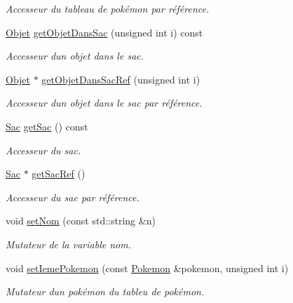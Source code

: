 \begin{DoxyCompactItemize}
\begin{DoxyCompactList}\small\item\em Accesseur du tableau de pokémon par référence. \end{DoxyCompactList}\item 
\hyperlink{class_objet}{Objet} \hyperlink{class_personnage_a32cf123b507c36c8adbf9bd22cb0b9a2}{get\+Objet\+Dans\+Sac} (unsigned int i) const
\begin{DoxyCompactList}\small\item\em Accesseur d\textquotesingle{}un objet dans le sac. \end{DoxyCompactList}\item 
\hyperlink{class_objet}{Objet} $\ast$ \hyperlink{class_personnage_a6b3462a550a38c9e9163495c2b2015f4}{get\+Objet\+Dans\+Sac\+Ref} (unsigned int i)
\begin{DoxyCompactList}\small\item\em Accesseur d\textquotesingle{}un objet dans le sac par référence. \end{DoxyCompactList}\item 
\hyperlink{class_sac}{Sac} \hyperlink{class_personnage_aa6dd3ce808644f01d0cdb891f67e896c}{get\+Sac} () const
\begin{DoxyCompactList}\small\item\em Accesseur du sac. \end{DoxyCompactList}\item 
\hyperlink{class_sac}{Sac} $\ast$ \hyperlink{class_personnage_acb7d9ff9b6b6753b8c93fae58f428db1}{get\+Sac\+Ref} ()
\begin{DoxyCompactList}\small\item\em Accesseur du sac par référence. \end{DoxyCompactList}\item 
void \hyperlink{class_personnage_a46d6d6f6f9b647c04c1cad509bec0935}{set\+Nom} (const std\+::string \&n)
\begin{DoxyCompactList}\small\item\em Mutateur de la variable nom. \end{DoxyCompactList}\item 
void \hyperlink{class_personnage_ae9e94e72e002695ae1461aa538e5e880}{set\+Ieme\+Pokemon} (const \hyperlink{class_pokemon}{Pokemon} \&pokemon, unsigned int i)
\begin{DoxyCompactList}\small\item\em Mutateur d\textquotesingle{}un pokémon du tableu de pokémon. \end{DoxyCompactList}\item 

\end{DoxyCompactItemize}
